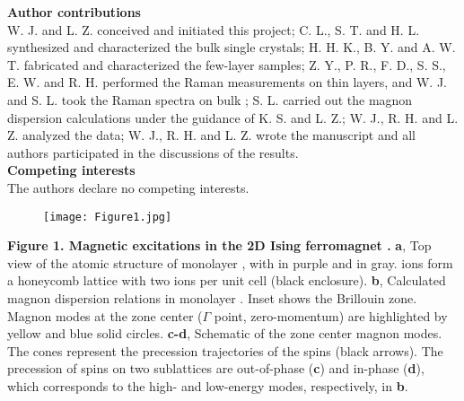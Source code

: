 \documentclass[prl, preprint, superscriptaddress]{revtex4-1}
\begin{document}
\noindent\textbf{Author contributions}\\
\noindent W. J. and L. Z. conceived and initiated this project; C. L., S. T. and H. L. synthesized and characterized the bulk  single crystals; H. H. K., B. Y. and A. W. T. fabricated and characterized the few-layer samples; Z. Y., P. R., F. D., S. S., E. W. and R. H. performed the Raman measurements on  thin layers, and W. J. and S. L. took the Raman spectra on bulk ; S. L. carried out the magnon dispersion calculations under the guidance of K. S. and L. Z.; W. J., R. H. and L. Z. analyzed the data; W. J., R. H. and L. Z. wrote the manuscript and all authors participated in the discussions of the results.\\

\noindent\textbf{Competing interests}\\
\noindent The authors declare no competing interests.

\newpage
\begin{figure}
\texttt{[image: Figure1.jpg]}
\end{figure}
\begin{footnotesize}
\noindent \textbf{Figure 1. Magnetic excitations in the 2D Ising ferromagnet .} \textbf{a}, Top view of the atomic structure of monolayer , with  in purple and  in gray.  ions form a honeycomb lattice with two  ions per unit cell (black enclosure). \textbf{b}, Calculated magnon dispersion relations in monolayer . Inset shows the Brillouin zone. Magnon modes at the zone center ($\varGamma$ point, zero-momentum) are highlighted by yellow and blue solid circles. \textbf{c-d}, Schematic of the zone center magnon modes. The cones represent the precession trajectories of the spins (black arrows). The precession of spins on two  sublattices are out-of-phase (\textbf{c}) and in-phase (\textbf{d}), which corresponds to the high- and low-energy modes, respectively, in \textbf{b}. 
\end{footnotesize}
\end{document}
